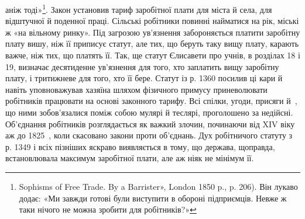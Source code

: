 \parcont{}  %
аніж тоді»\footnote{
Sophisms of Free Trade. By a Barrister», London 1850 p., p. 206).
Він лукаво додає: «Ми завжди готові були виступити в обороні підприємців.
Невже ж таки нічого не можна зробити для робітників?»
}. Закон установив тариф заробітної плати для міста
й села, для відштучної й поденної праці. Сільські робітники
повинні найматися на рік, міські ж «на вільному ринку». Під
загрозою ув’язнення забороняється платити заробітну плату
вишу, ніж її приписує статут, але тих, що беруть таку вищу
плату, карають важче, ніж тих, що платять її. Так, ще статут
Єлисавети про учнів, в розділах 18 і 19, визначає десятиденне
ув’язнення для того, хто заплатить вищу заробітну плату, і
тритижневе для того, хто її бере. Статут із р. 1360 посилив ці
кари й навіть уповноважував хазяїна шляхом фізичного примусу
приневолювати робітників працювати на основі законного тарифу.
Всі спілки, угоди, присяги й~, що ними зобов’язалися поміж
собою мулярі й теслярі, проголошено за недійсні. Об’єднання
робітників розглядається як важкий злочин, починаючи від
XIV віку аж до 1825~, коли скасовано закони проти об’єднань.
Дух робітничого статуту з р. 1349 і всіх пізніших яскраво виявляється
в тому, що держава, щоправда, встановлювала максимум
заробітної плати, але аж ніяк не мінімум її.

